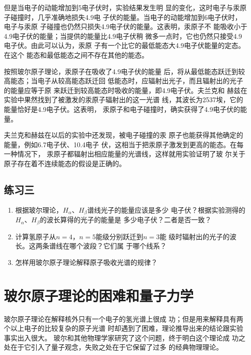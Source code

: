     但是当电子的动能增加到5电子伏时，实验结果发生明
    显的变化，这时电子与汞原子碰撞时，几乎准确地损失4.9电
    子伏的能量。当电子的动能增加到6电子伏时，电子与汞原
    子碰撞也仍然只损失4.9电子伏的能量。这表明，汞原子不
    能吸收小于4.9电子伏的能量；当提供的能量比4.9电子伏稍
    微多一点时，它也仍然只接受4.9电子伏。由此可以认为，汞原
    子有一个比它的最低能态大4.9电子伏能量的定态。在这个
    能态和最低能态之间不存在其他的能态。

    按照玻尔原子理论，汞原子在吸收了4.9电子伏的能量
    后，将从最低能态跃迁到较高能态；当电子从较高能态跃迁回
    低能态时，应辐射出光子，而且辐射出的光子的能量应等于原
    来跃迁到较高能态时吸收的能量，即4.9电子伏。夫兰克和
    赫兹在实验中果然找到了被激发的汞原子辐射出的这一光谱
    线，其波长为2537埃，它的能量恰好是4.9电子伏。这表明，
    汞原子和电子碰撞时，确实获得了4.9电子伏的能量。

    夫兰克和赫兹在以后的实验中还发现，被电子碰撞的汞
    原子也能获得其他确定的能量，例如6.7电子伏、10.4电子
伏，这相当于把汞原子激发到更高的能态。在每一种情况下，
汞原子都辐射出相应能量的光谱线，这样就用实验证明了玻
尔关于原子存在着不连续能态的假设是正确的。


\subsection*{练习三}
\begin{enumerate}
    \item 根据玻尔理论，$H_{\alpha}$、$H_{\beta}$谱线光子的能量应该是多少
电子伏？根据实验测得的$H_{\alpha}$、$H_{\beta}$的波长算得的光子的能量是
多少电子伏？二者是否一致？
\item 计算氢原子从$n=4$，$n=5$能级分别跃迁到$n=3$能
级时辐射出的光子的波长。这两条谱线在哪个波段？它们属
于哪个线系？
\item 怎样用玻尔原子理论解释原子吸收光谱的规律？
\end{enumerate}


\section{玻尔原子理论的困难和量子力学}

玻尔原子理论在解释核外只有一个电子的氢光谱上很成
功；但是用来解释具有两个以上电子的比较复杂的原子光谱
时却遇到了困难，理论推导出来的结论跟实验事实出入很大。
玻尔和其他物理学家研究了这个问题，终于明白这个理论成
功之处在于它引入了量子观念，失败之处在于它保留了过多
的经典物理理论。

